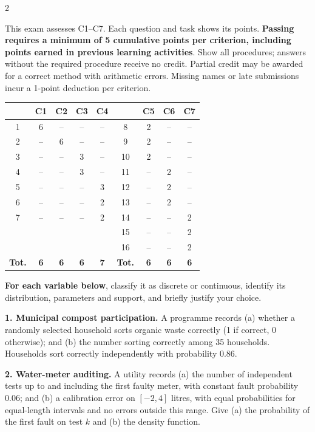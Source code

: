 \begin{multicols}{2}

This exam assesses C1--C7. Each question and task shows its points. \textbf{Passing requires a minimum of 5 cumulative points per criterion, including points earned in previous learning activities}. Show all procedures; answers without the required procedure receive no credit. Partial credit may be awarded for a correct method with arithmetic errors. Missing names or late submissions incur a 1-point deduction per criterion.

\begin{center}
	\small\setlength{\tabcolsep}{5pt}
	\begin{tabular}{|c|c|c|c|c||c|c|c|c|}
		\hline
		\textbf{\textnumero}&\textbf{C1}&\textbf{C2}&\textbf{C3}&\textbf{C4}&
		\textbf{\textnumero}&\textbf{C5}&\textbf{C6}&\textbf{C7}\\\hline
		1&6&--&--&--&8&2&--&--\\\hline
		2&--&6&--&--&9&2&--&--\\\hline
		3&--&--&3&--&10&2&--&--\\\hline
		4&--&--&3&--&11&--&2&--\\\hline
		5&--&--&--&3&12&--&2&--\\\hline
		6&--&--&--&2&13&--&2&--\\\hline
		7&--&--&--&2&14&--&--&2\\\hline
		&&&&&15&--&--&2\\\hline
		&&&&&16&--&--&2\\\hline
		\textbf{Tot.}&\textbf{6}&\textbf{6}&\textbf{6}&\textbf{7}&
		\textbf{Tot.}&\textbf{6}&\textbf{6}&\textbf{6}\\\hline
	\end{tabular}
\end{center}

\columnbreak

\raggedcolumns
{}
\textbf{For each variable below}, classify it as discrete or continuous, identify its distribution, parameters and support, and briefly justify your choice.

\textbf{1. Municipal compost participation.} A programme records (a) whether a randomly selected household sorts organic waste correctly (1 if correct, 0 otherwise); and (b) the number sorting correctly among 35 households. Households sort correctly independently with probability 0.86. 

\textbf{2. Water-meter auditing.} A utility records (a) the number of independent tests up to and including the first faulty meter, with constant fault probability 0.06; and (b) a calibration error on $[-2,4]$ litres, with equal probabilities for equal-length intervals and no errors outside this range. Give (a) the probability of the first fault on test $k$ and (b) the density function. 


\end{multicols}
